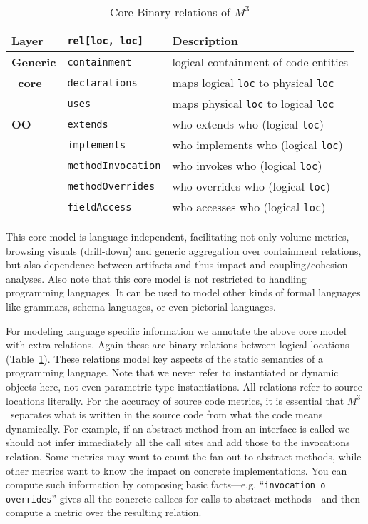\documentclass[conference]{IEEEtran}
\newcommand{\mthree}{\ensuremath{M^3}\xspace}
\begin{document}
\begin{table}[t]
\begin{tabularx}{\columnwidth}{|l|l|X|}\hline
 Layer & \lstinline!rel[loc, loc]! & Description \\ \hline 
\textbf{Generic} & \lstinline!containment! & logical containment of 
code entities \\
\textbf{~core} & \lstinline!declarations! & maps logical \lstinline!loc! to physical \lstinline!loc! \\
& \lstinline!uses! & maps physical \lstinline!loc! to logical \lstinline!loc! \\ \hline
 \textbf{OO} & \lstinline!extends! & who extends who (logical \lstinline!loc!) \\
& \lstinline!implements! & who implements who  (logical \lstinline!loc!) \\
& \lstinline!methodInvocation! & who invokes who (logical \lstinline!loc!) \\
& \lstinline!methodOverrides! & who overrides who (logical \lstinline!loc!) \\
& \lstinline!fieldAccess! & who accesses who (logical \lstinline!loc!)\\ \hline
\end{tabularx}
\caption{Core Binary relations of \mthree \label{table:core}}
\vspace{-5mm}
\end{table}

This core model is language independent, facilitating not only volume metrics,
browsing visuals (drill-down) and generic aggregation over containment
relations, but also dependence between artifacts and thus impact and
coupling/cohesion analyses. Also note that this core model is not restricted
to handling programming languages. It can be used to model other kinds of
formal languages like grammars, schema languages, or even pictorial languages.

For modeling language specific information we annotate the above core model
with extra relations. Again these are binary relations between logical
locations (Table~\ref{table:core}). These relations model key aspects of the static semantics
of a programming language. Note that we never refer to instantiated or dynamic
objects here, not even parametric type instantiations. All relations refer to
source locations literally. 
For the accuracy of source code metrics, it is
essential that \mthree\  separates what is written in the source code from
what the code means dynamically. 
For example, if an abstract method from an
interface is called we should not infer immediately all the call sites and add
those to the invocations relation. Some metrics may want to count the fan-out
to abstract methods, while other metrics want to know the impact on concrete
implementations. You can compute such information by composing basic
facts---e.g. ``\lstinline!invocation o overrides!'' gives all the concrete callees
for calls to abstract methods---and then compute a metric over the resulting
relation.
\end{document}
